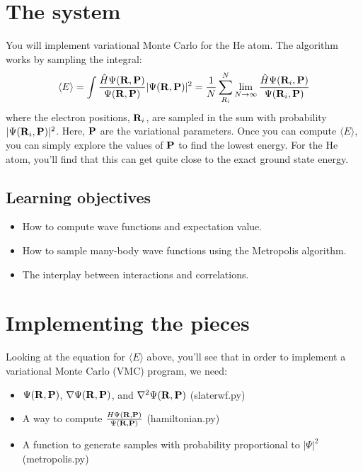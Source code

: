 \documentclass[12pt]{article}
\newcommand{\bR}{{\bf R}}
\newcommand{\bP}{{\bf P}}
\begin{document}
\section{The system} 

You will implement variational Monte Carlo for the He atom. 
The algorithm works by sampling the integral:
\begin{equation}
  \langle
  E
  \rangle
  =
  \int
  \frac{\hat{H} \Psi(\bR,\bP)}{\Psi(\bR,\bP)}
  |\Psi(\bR,\bP)|^2
  =
  \frac{1}{N}
  \sum_{R_i}^N
  \lim_{N\to \infty}
  \frac{\hat{H} \Psi(\bR_i,\bP)}{\Psi(\bR_i,\bP)}
\end{equation}
where the electron positions, $\bR_i$, are sampled in the sum with probability $|\Psi(\bR_i,\bP)|^2$.
Here, $\bP$ are the variational parameters.
Once you can compute $\langle E \rangle$, you can simply explore the values of $\bP$ to find the lowest energy.
For the He atom, you'll find that this can get quite close to the exact ground state energy.

\subsection{Learning objectives}
\begin{itemize}
\item How to compute wave functions and expectation value.
\item How to sample many-body wave functions using the Metropolis algorithm.
\item The interplay between interactions and correlations. 
\end{itemize}

\section{Implementing the pieces}

Looking at the equation for $\langle E \rangle$ above, you'll see that in order to implement a variational Monte Carlo (VMC) program, we need:
\begin{itemize}
	\item $\Psi(\bR,\bP)$, $\nabla \Psi(\bR,\bP)$, and $\nabla^2 \Psi(\bR,\bP)$ (slaterwf.py)
	\item A way to compute $\frac{H\Psi(\bR,\bP)}{\Psi(\bR,\bP)}$ (hamiltonian.py)
	\item A function to generate samples with probability proportional to $|\Psi|^2$ (metropolis.py)
\end{itemize}
\end{document}
